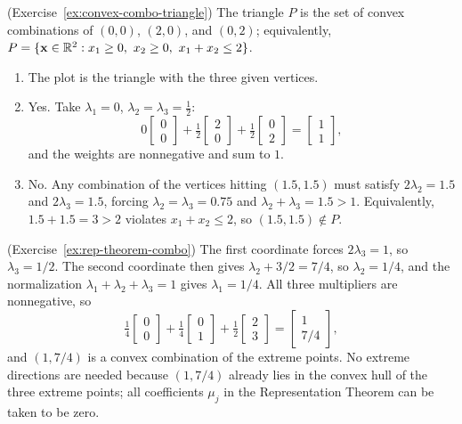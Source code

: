 \begin{solution}(Exercise~\ref{ex:convex-combo-triangle})
The triangle \( P \) is the set of convex combinations of \( (0,0) \), \( (2,0) \), and \( (0,2) \); equivalently, \( P = \{ \mathbf{x} \in \mathbb{R}^2 : x_1 \geq 0,\ x_2 \geq 0,\ x_1 + x_2 \leq 2 \} \).

\begin{enumerate}
    \item The plot is the triangle with the three given vertices.
    \item Yes.  Take \( \lambda_1 = 0 \), \( \lambda_2 = \lambda_3 = \tfrac12 \):
    \[
    0 \begin{bmatrix} 0 \\ 0 \end{bmatrix} + \tfrac12 \begin{bmatrix} 2 \\ 0 \end{bmatrix} + \tfrac12 \begin{bmatrix} 0 \\ 2 \end{bmatrix} = \begin{bmatrix} 1 \\ 1 \end{bmatrix},
    \]
    and the weights are nonnegative and sum to \( 1 \).
    \item No.  Any combination of the vertices hitting \( (1.5, 1.5) \) must satisfy \( 2\lambda_2 = 1.5 \) and \( 2\lambda_3 = 1.5 \), forcing \( \lambda_2 = \lambda_3 = 0.75 \) and \( \lambda_2 + \lambda_3 = 1.5 > 1 \).  Equivalently, \( 1.5 + 1.5 = 3 > 2 \) violates \( x_1 + x_2 \leq 2 \), so \( (1.5, 1.5) \notin P \).
\end{enumerate}
\end{solution}

\begin{solution}(Exercise~\ref{ex:rep-theorem-combo})
The first coordinate forces \( 2\lambda_3 = 1 \), so \( \lambda_3 = 1/2 \). The second coordinate then gives \( \lambda_2 + 3/2 = 7/4 \), so \( \lambda_2 = 1/4 \), and the normalization \( \lambda_1 + \lambda_2 + \lambda_3 = 1 \) gives \( \lambda_1 = 1/4 \). All three multipliers are nonnegative, so
\[
\tfrac{1}{4} \begin{bmatrix} 0 \\ 0 \end{bmatrix} + \tfrac{1}{4} \begin{bmatrix} 0 \\ 1 \end{bmatrix} + \tfrac{1}{2} \begin{bmatrix} 2 \\ 3 \end{bmatrix} = \begin{bmatrix} 1 \\ 7/4 \end{bmatrix},
\]
and \( (1, 7/4) \) is a convex combination of the extreme points. No extreme directions are needed because \( (1, 7/4) \) already lies in the convex hull of the three extreme points; all coefficients \( \mu_j \) in the Representation Theorem can be taken to be zero.
\end{solution}

